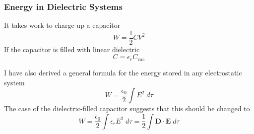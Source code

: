 \documentclass[../../../main.tex]{subfiles}
\begin{document}
\subsubsection{Energy in Dielectric Systems}
It takes work to charge up a capacitor 
\begin{equation*}
    W=\frac{1}{2}CV^2
\end{equation*}
If the capacitor is filled with linear dielectric
\begin{equation*}
    C=\epsilon_rC_{\text{vac}}
\end{equation*}

I have also derived a general formula for the energy stored in any electrostatic system
\begin{equation*}
    W=\frac{\epsilon_0}{2}\int E^2\;d\tau
\end{equation*}
The case of the dielectric-filled capacitor suggests that this should be changed to
\begin{equation*}
    W=\frac{\epsilon_0}{2}\int \epsilon_rE^2\;d\tau=\frac{1}{2} \int\mathbf{D}\cdot\mathbf{E}\;d\tau
\end{equation*}
\end{document}
